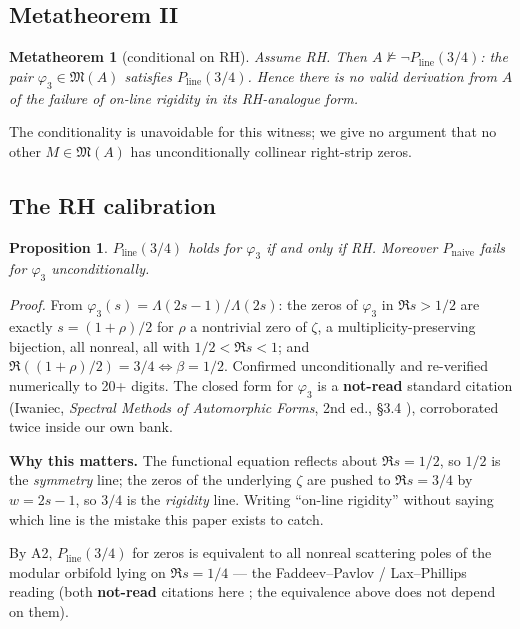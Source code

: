 \documentclass[11pt]{amsart}
\newtheorem{metatheorem}[theorem]{Metatheorem}
\newtheorem{proposition}[theorem]{Proposition}
\theoremstyle{remark}
\begin{document}
\subsection{Metatheorem II}

\begin{metatheorem}[conditional on RH]
Assume RH. Then $A\nvDash\neg P_{\mathrm{line}}(3/4)$: the pair
$\varphi_3\in\mathfrak M(A)$ satisfies $P_{\mathrm{line}}(3/4)$. Hence
there is no valid derivation from $A$ of the failure of on-line rigidity
in its RH-analogue form.
\end{metatheorem}

The conditionality is unavoidable for this witness; we give no argument
that no other $M\in\mathfrak M(A)$ has unconditionally collinear
right-strip zeros.

\subsection{The RH calibration}

\begin{proposition}
$P_{\mathrm{line}}(3/4)$ holds for $\varphi_3$ if and only if RH.
Moreover $P_{\mathrm{naive}}$ fails for $\varphi_3$ unconditionally.
\end{proposition}

\emph{Proof.} From $\varphi_3(s)=\Lambda(2s-1)/\Lambda(2s)$: the zeros of
$\varphi_3$ in $\Re s>1/2$ are exactly $s=(1+\rho)/2$ for $\rho$ a
nontrivial zero of $\zeta$, a multiplicity-preserving bijection, all
nonreal, all with $1/2<\Re s<1$; and $\Re((1+\rho)/2)=3/4\iff\beta=1/2$.
Confirmed unconditionally and re-verified numerically to 20+ digits. The
closed form for $\varphi_3$ is a \textbf{not-read} standard citation
(Iwaniec, \emph{Spectral Methods of Automorphic Forms}, 2nd ed., \S3.4
\cite{Iwaniec2002}), corroborated twice inside our own bank.

\textbf{Why this matters.} The functional equation reflects about
$\Re s=1/2$, so $1/2$ is the \emph{symmetry} line; the zeros of the
underlying $\zeta$ are pushed to $\Re s=3/4$ by $w=2s-1$, so $3/4$ is the
\emph{rigidity} line. Writing ``on-line rigidity'' without saying which
line is the mistake this paper exists to catch.

By A2, $P_{\mathrm{line}}(3/4)$ for zeros is equivalent to all nonreal
scattering poles of the modular orbifold lying on $\Re s=1/4$ --- the
Faddeev--Pavlov / Lax--Phillips reading (both \textbf{not-read}
citations here \cite{FaddeevPavlov1972,LaxPhillips1976}; the equivalence
above does not depend on them).
\end{document}
